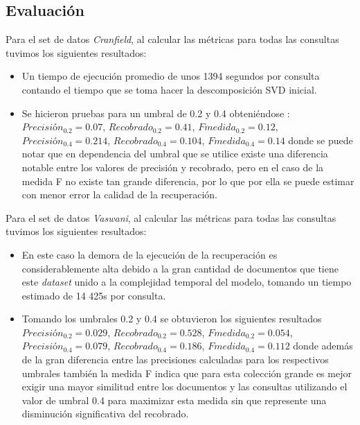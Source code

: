 \documentclass[spanish]{article}
\begin{document}
\subsection*{Evaluación}

Para el set de datos \emph{Cranfield}, al calcular las métricas para todas las consultas tuvimos los siguientes resultados: 

\begin{itemize}

\item Un tiempo de ejecución promedio de unos 1394 segundos por consulta contando el tiempo que se toma hacer la descomposición SVD inicial.

 \item Se hicieron pruebas para un umbral de 0.2 y 0.4 obteniéndose : $Precisión_{0.2}=0.07 $, $Recobrado_{0.2}= 0.41$, $Fmedida_{0.2}=0.12$, $Precisión_{0.4}=0.214 $, $Recobrado_{0.4}= 0.104$, $Fmedida_{0.4}=0.14$ donde se puede notar que en dependencia del umbral que se utilice existe una diferencia notable entre los valores de precisión y recobrado, pero en el caso de la medida F no existe tan grande diferencia, por lo que por ella se puede estimar con menor error la calidad de la recuperación.
 
\end{itemize}
 

Para el set de datos \emph{Vaswani}, al calcular las métricas para todas las consultas tuvimos los siguientes resultados: 

\begin{itemize}

\item En este caso la demora de la ejecución de la recuperación es considerablemente alta debido a la gran cantidad de documentos que tiene este \emph{dataset} unido a la complejidad temporal del modelo, tomando un tiempo estimado de 14 425s por consulta.

\item Tomando los umbrales 0.2 y 0.4 se obtuvieron los siguientes resultados $Precisión_{0.2}=0.029 $, $Recobrado_{0.2}= 0.528$, $Fmedida_{0.2}=0.054$, $Precisión_{0.4}=0.079 $, $Recobrado_{0.4}= 0.186$, $Fmedida_{0.4}=0.112$ donde además de la gran diferencia entre las precisiones calculadas para los respectivos umbrales también la medida F indica que para esta colección grande es mejor exigir una mayor similitud entre los documentos y las consultas utilizando el valor de umbral 0.4 para maximizar esta medida sin que represente una disminución significativa del recobrado.

\end{itemize}
\end{document}
